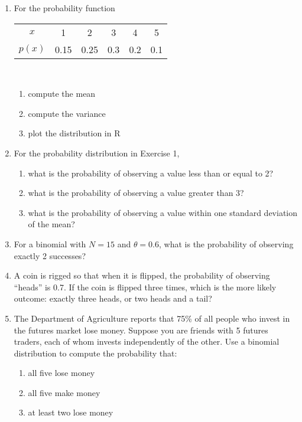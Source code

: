 \documentclass[10pt]{article}
\begin{document}
\begin{enumerate}
\item For the probability function

\begin{centering}
  \begin{tabular}{cccccc}
    \hline
    $x$ & 1 & 2 & 3 & 4 & 5\\
    $p(x)$ & 0.15 & 0.25 & 0.3 & 0.2 & 0.1\\
    \hline                         
  \end{tabular}\\
\end{centering}

  \begin{enumerate}
    \item compute the mean
    \item compute the variance
    \item plot the distribution in R
  \end{enumerate}

\item For the probability distribution in Exercise 1,
  \begin{enumerate}
  \item what is the probability of observing a value less than or equal to 2?
  \item what is the probability of observing a value greater than 3?
    \item what is the probability of observing a value within one standard deviation of the mean?
    \end{enumerate}


\item For a binomial with $N=15$ and $\theta = 0.6$, what is the probability of observing exactly 2 successes?

\item A coin is rigged so that when it is flipped, the probability of observing ``heads'' is 0.7.  If the coin is flipped three times, which is the more likely outcome: exactly three heads, or two heads and a tail?

\item The Department of Agriculture reports that 75\% of all people who invest in the futures market lose money.  Suppose you are friends with 5 futures traders, each of whom invests independently of the other.  Use a binomial distribution to compute the probability that:
  \begin{enumerate}
  \item all five lose money
  \item all five make money
    \item at least two lose money
  \end{enumerate}



\end{enumerate}
\end{document}

